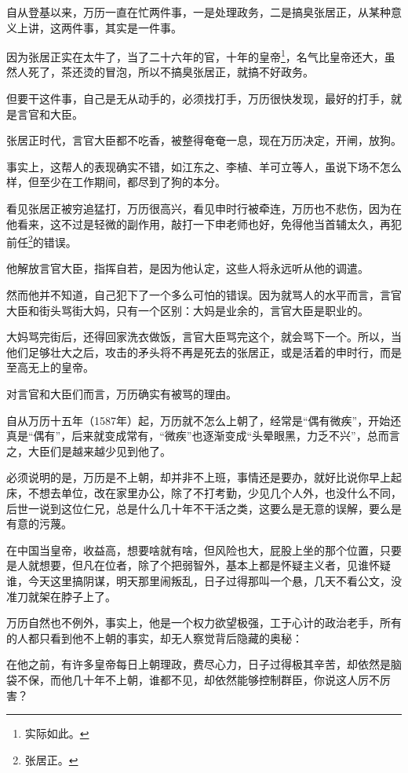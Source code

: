\begin{multicols}{\theparacolNo}
自从登基以来，万历一直在忙两件事，一是处理政务，二是搞臭张居正，从某种意义上讲，这两件事，其实是一件事。

因为张居正实在太牛了，当了二十六年的官，十年的皇帝\footnote{实际如此。}，名气比皇帝还大，虽然人死了，茶还烫的冒泡，所以不搞臭张居正，就搞不好政务。

但要干这件事，自己是无从动手的，必须找打手，万历很快发现，最好的打手，就是言官和大臣。

张居正时代，言官大臣都不吃香，被整得奄奄一息，现在万历决定，开闸，放狗。

事实上，这帮人的表现确实不错，如江东之、李植、羊可立等人，虽说下场不怎么样，但至少在工作期间，都尽到了狗的本分。

看见张居正被穷追猛打，万历很高兴，看见申时行被牵连，万历也不悲伤，因为在他看来，这不过是轻微的副作用，敲打一下申老师也好，免得他当首辅太久，再犯前任\footnote{张居正。}的错误。

他解放言官大臣，指挥自若，是因为他认定，这些人将永远听从他的调遣。

然而他并不知道，自己犯下了一个多么可怕的错误。因为就骂人的水平而言，言官大臣和街头骂街大妈，只有一个区别：大妈是业余的，言官大臣是职业的。

大妈骂完街后，还得回家洗衣做饭，言官大臣骂完这个，就会骂下一个。所以，当他们足够壮大之后，攻击的矛头将不再是死去的张居正，或是活着的申时行，而是至高无上的皇帝。

对言官和大臣们而言，万历确实有被骂的理由。

自从万历十五年（1587年）起，万历就不怎么上朝了，经常是“偶有微疾”，开始还真是“偶有”，后来就变成常有，“微疾”也逐渐变成“头晕眼黑，力乏不兴”，总而言之，大臣们是越来越少见到他了。

必须说明的是，万历是不上朝，却并非不上班，事情还是要办，就好比说你早上起床，不想去单位，改在家里办公，除了不打考勤，少见几个人外，也没什么不同，后世一说到这位仁兄，总是什么几十年不干活之类，这要么是无意的误解，要么是有意的污蔑。

在中国当皇帝，收益高，想要啥就有啥，但风险也大，屁股上坐的那个位置，只要是人就想要，但凡在位者，除了个把弱智外，基本上都是怀疑主义者，见谁怀疑谁，今天这里搞阴谋，明天那里闹叛乱，日子过得那叫一个悬，几天不看公文，没准刀就架在脖子上了。

万历自然也不例外，事实上，他是一个权力欲望极强，工于心计的政治老手，所有的人都只看到他不上朝的事实，却无人察觉背后隐藏的奥秘：

在他之前，有许多皇帝每日上朝理政，费尽心力，日子过得极其辛苦，却依然是脑袋不保，而他几十年不上朝，谁都不见，却依然能够控制群臣，你说这人厉不厉害？


\end{multicols}
